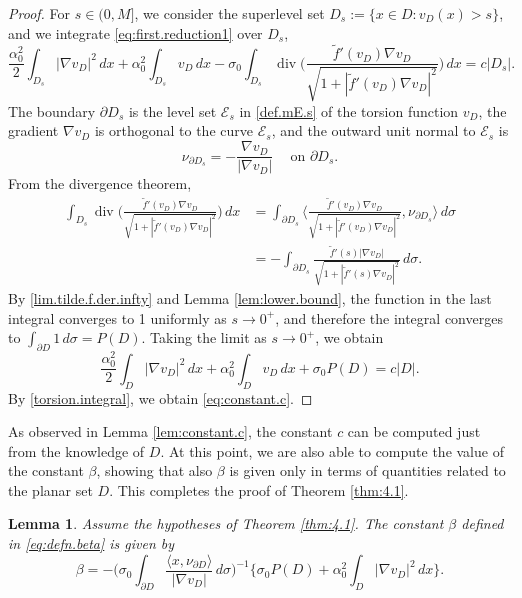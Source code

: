 \documentclass[10pt,reqno,a4paper]{article}
\numberwithin{equation}{section}
\theoremstyle{plain}
\newtheorem{lemma}[theorem]{Lemma}
\theoremstyle{definition}
\newcommand{\mE}{\mathcal{E}}
\newcommand{\la}{\langle}
\newcommand{\ra}{\rangle}
\newcommand{\pa}{\partial}
\renewcommand{\div}{\operatorname{div}} %
\newcommand{\grad}{\nabla}
\begin{document}
\begin{proof} 
For $s \in (0, M]$, we consider the superlevel set 
$D_s := \{ x \in D : v_D(x) > s \}$, 
and we integrate \eqref{eq:first.reduction1} over $D_s$,
\[
\frac{ \alpha_0^2 }{2} \int_{D_s} |\nabla v_D|^2 \, dx
+ \alpha_0^2 \int_{D_s} v_D \, dx
- \sigma_0 \int_{D_s} \div \bigg( \frac{\tilde f'(v_D) \nabla v_D}
{\sqrt{1 + |\tilde f'(v_D) \nabla v_D|^2}} \bigg) \,dx
= c|D_s|.
\]
The boundary $\pa D_s$ is the level set $\mE_s$ in \eqref{def.mE.s} of the torsion function $v_D$, 
the gradient $\grad v_D$ is orthogonal to the curve $\mE_s$, 
and the outward unit normal to $\mE_s$ is 
\[
\nu_{\pa D_s} = - \frac{\grad v_D}{|\grad v_D|} \quad \ \text{on } \pa D_s.
\]
From the divergence theorem, 
\begin{align*}
\int_{D_s} \div \bigg( \frac{\tilde f'(v_D) \nabla v_D}
{\sqrt{1 + |\tilde f'(v_D) \nabla v_D|^2}} \bigg) \,dx 
& = \int_{\pa D_s} \la \frac{\tilde f'(v_D) \nabla v_D}{\sqrt{1 + |\tilde f'(v_D) \nabla v_D|^2}} , 
\nu_{\pa D_s} \ra \, d\sigma 
\\ 
& = - \int_{\pa D_s} \frac{\tilde f'(s) |\nabla v_D|}{\sqrt{1 + |\tilde f'(s) \nabla v_D|^2}} \, d\sigma. 
\end{align*}
By \eqref{lim.tilde.f.der.infty} and Lemma \ref{lem:lower.bound}, 
the function in the last integral converges to 1 uniformly as $s \to 0^+$,
and therefore the integral converges to $\int_{\pa D} 1 \, d\sigma = P(D)$.  
Taking the limit as $s \to 0^+$, we obtain 
\[
\frac{ \alpha_0^2 }{2} \int_{D} |\nabla v_D|^2 \, dx
+ \alpha_0^2 \int_{D} v_D \, dx
+ \sigma_0 P(D) 
= c|D|.
\]
By \eqref{torsion.integral}, we obtain \eqref{eq:constant.c}.
\end{proof}

As observed in Lemma \ref{lem:constant.c}, the constant $c$ can be computed just from the knowledge of $D$.
At this point, we are also able to compute the value of the constant $\beta$, 
showing that also $\beta$ is given only in terms of quantities related to the planar set $D$.
This completes the proof of Theorem \ref{thm:4.1}. 

\begin{lemma}\label{lem:beta}
Assume the hypotheses of Theorem \ref{thm:4.1}. 
The constant $\beta$ defined in \eqref{eq:defn.beta} is given by 
\begin{equation} \label{formula.in.lem:beta}
\beta = - \Big( \sigma_0 \int_{\pa D} \frac{\la x,\nu_{\pa D}\ra}{|\nabla v_D|} \, d\sigma \Big)^{-1} 
\Big\{ \sigma_0 P(D) + \alpha_0^2 \int_D |\nabla v_D|^2 \, dx \Big\}.
\end{equation}
\end{lemma}
\end{document}
